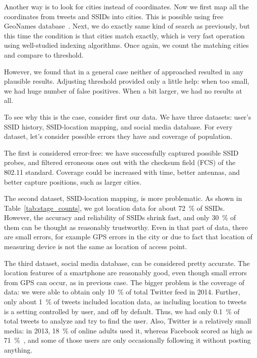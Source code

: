 \documentclass[12pt,a4paper,oneside,pdftex]{report}
\begin{document}
Another way is to look for cities instead of coordinates. Now we first map all the coordinates from tweets and SSIDs into cities. This is possible using free GeoNames database~\cite{geonames}. Next, we do exactly same kind of search as previously, but this time the condition is that cities match exactly, which is very fast operation using well-studied indexing algorithms. Once again, we count the matching cities and compare to threshold.

However, we found that in a general case neither of approached resulted in any plausible results. Adjusting threshold provided only a little help: when too small, we had huge number of false positives. When a bit larger, we had no results at all.

To see why this is the case, consider first our data. We have three datasets: user's SSID history, SSID-location mapping, and social media database. For every dataset, let's consider possible errors they have and coverage of population.

The first is considered error-free: we have successfully captured possible SSID probes, and filtered erroneous ones out with the checksum field (FCS) of the 802.11 standard. Coverage could be increased with time, better antennas, and better capture positions, such as larger cities.

The second dataset, SSID-location mapping, is more problematic. As shown in Table~\ref{tab:stage_counts}, we got location data for about 72~\% of SSIDs. However, the accuracy and reliability of SSIDs shrink fast, and only 30~\% of them can be thought as reasonably trustworthy. Even in that part of data, there are small errors, for example GPS errors in the city or due to fact that location of measuring device is not the same as location of access point.

The third dataset, social media database, can be considered pretty accurate. The location features of a smartphone are reasonably good, even though small errors from GPS can occur, as in previous case. The bigger problem is the coverage of data: we were able to obtain only 10~\% of total Twitter feed in 2014. Further, only about 1~\% of tweets included location data, as including location to tweets is a setting controlled by user, and off by default. Thus, we had only 0.1~\% of total tweets to analyze and try to find the user. Also, Twitter is a relatively small media: in 2013, 18~\% of online adults used it, whereas Facebook scored as high as 71~\%~\cite{pew_socialmedia}, and some of those users are only occasionally following it without posting anything.
\end{document}
